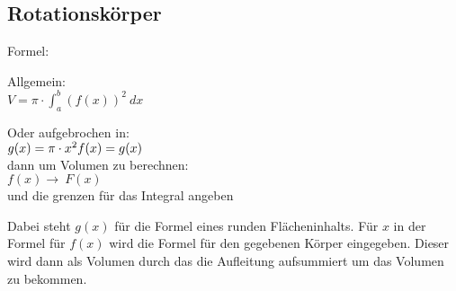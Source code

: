 \subsection{Rotationskörper}
Formel: 
\par
Allgemein: \\
$
V = \pi \cdot \int_a^b (f(x))^2\ dx
$ 
\par
Oder aufgebrochen in: \\
$
g(x) = \pi\cdot x^2 \\
f(x) = g(x)
$ \\
dann um Volumen zu berechnen: \\
$
f(x) \rightarrow\ F(x)
$ \\
und die grenzen für das Integral angeben 
\par
Dabei steht $g(x)$ für die Formel eines runden Flächeninhalts.
Für $x$ in der Formel für $f(x)$ wird die Formel für den gegebenen Körper eingegeben.
Dieser wird dann als Volumen durch das die Aufleitung aufsummiert um das Volumen zu bekommen.


